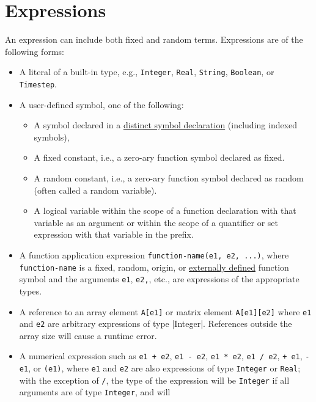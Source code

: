 \documentclass[12pt]{article}
\begin{document}
\section{Expressions}\label{expression-section}

An expression can include both fixed and random terms.  Expressions are of the following forms:
\begin{itemize}
\item A literal of a built-in type, e.g., {\tt Integer}, {\tt Real},
  {\tt String}, {\tt Boolean}, or {\tt Timestep}.
\item A user-defined symbol, one of the following:
\begin{itemize}
\item A symbol declared in a \hyperref[distinct-section]{distinct
  symbol declaration} (including indexed symbols),
\item A fixed constant, i.e., a zero-ary function symbol declared as fixed.
\item A random constant, i.e., a zero-ary function symbol declared as
  random (often called a random variable).
\item A logical variable within the scope of a function declaration
  with that variable as an argument or within the scope of a
  quantifier or set expression with that variable in the prefix.
\end{itemize}
\item A function application expression {\tt function-name(e1, e2,
  ...)}, where {\tt function-name} is a fixed, random, origin, or
  \hyperref[external-function-section]{externally defined} function
  symbol and the arguments {\tt e1}, {\tt e2,}, etc., are
  expressions of the appropriate types.
\item A reference to an array element {\tt A[e1]} or matrix element
  {\tt A[e1][e2]} where {\tt e1} and {\tt e2} are arbitrary
  expressions of type \blog|Integer|.%
  References outside the array size will cause a runtime error.
\item A numerical expression such as \texttt{e1 + e2}, \texttt{e1 - e2},
  \texttt{e1 * e2}, \texttt{e1 / e2},  \texttt{+ e1},
  \texttt{- e1}, or \texttt{(e1)}, 
  where \texttt{e1} and \texttt{e2} are also expressions of
  type \texttt{Integer} or \texttt{Real};
  with the exception of {\tt /}, the type of the expression will be
  {\tt Integer} if all arguments are of type {\tt Integer}, and will

\end{itemize}
\end{document}
